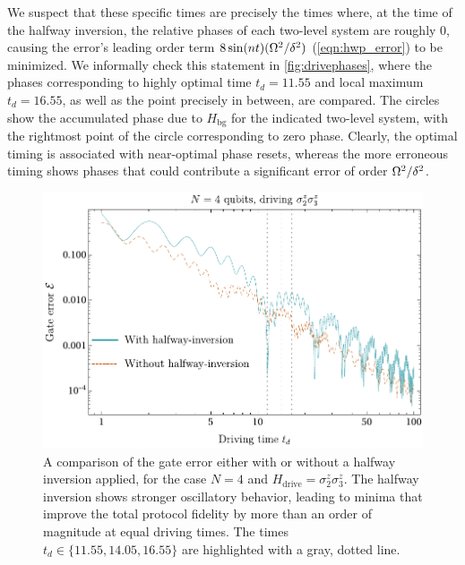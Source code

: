 We suspect that these specific times are precisely the times where, at the time of the halfway inversion, the relative phases of each two-level system are roughly $0$, causing the error's leading order term $8 \sin(nt) (\Omega^2 / \delta^2)$ (\cref{eqn:hwp_error}) to be minimized. We informally check this statement in \cref{fig:drivephases}, where the phases corresponding to highly optimal time $t_d = 11.55$ and local maximum $t_d = 16.55$, as well as the point precisely in between, are compared. The circles show the accumulated phase due to $H_\text{bg}$ for the indicated two-level system, with the rightmost point of the circle corresponding to zero phase. Clearly, the optimal timing is associated with near-optimal phase resets, whereas the more erroneous timing shows phases that could contribute a significant error of order $\Omega^2 / \delta^2$.

\begin{figure}
\centering
\includegraphics[width=.74\textwidth]{img/Polychronakos_compare_hwp.pdf} 
\caption{A comparison of the gate error either with or without a halfway inversion applied, for the case $N=4$ and $H_\text{drive} = \sigma_2^z \sigma_3^z$. The halfway inversion shows stronger oscillatory behavior, leading to minima that improve the total protocol fidelity by more than an order of magnitude at equal driving times. The times $t_d \in \{ 11.55, 14.05, 16.55 \}$ are highlighted with a gray, dotted line.}
\label{fig:compare_hwp}
\end{figure}




